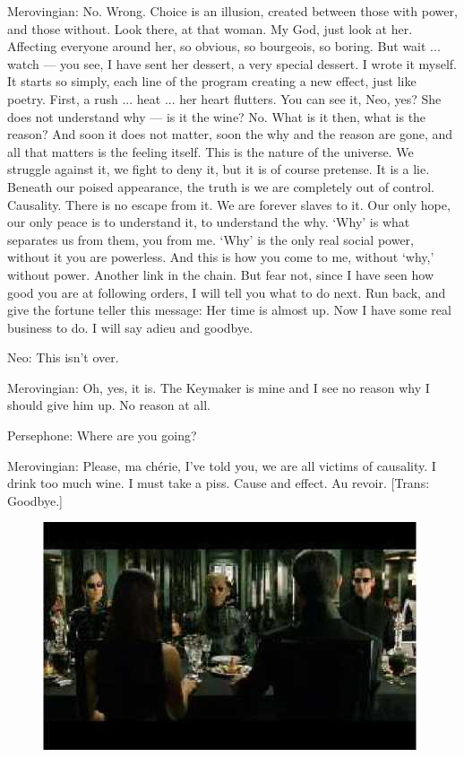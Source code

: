 \documentclass{ctexart}
\newenvironment{myquote}{\color{green} \setlength{\leftskip}{6em} \setlength{\rightskip}{4em} \setlength{\parindent}{-2em}}{\par}
\begin{document}
\begin{myquote}
Merovingian: No. Wrong. Choice is an illusion, created between those with power, and those without. Look there, at that woman. My God, just look at her. Affecting everyone around her, so obvious, so bourgeois, so boring. But wait ... watch --- you see, I have sent her dessert, a very special dessert. I wrote it myself. It starts so simply, each line of the program creating a new effect, just like poetry. First, a rush ... heat ... her heart flutters. You can see it, Neo, yes? She does not understand why --- is it the wine? No. What is it then, what is the reason? And soon it does not matter, soon the why and the reason are gone, and all that matters is the feeling itself. This is the nature of the universe. We struggle against it, we fight to deny it, but it is of course pretense. It is a lie. Beneath our poised appearance, the truth is we are completely out of control. Causality. There is no escape from it. We are forever slaves to it. Our only hope, our only peace is to understand it, to understand the why. `Why' is what separates us from them, you from me. `Why' is the only real social power, without it you are powerless. And this is how you come to me, without `why,' without power. Another link in the chain. But fear not, since I have seen how good you are at following orders, I will tell you what to do next. Run back, and give the fortune teller this message: Her time is almost up. Now I have some real business to do. I will say adieu and goodbye.

Neo: This isn't over.

Merovingian: Oh, yes, it is. The Keymaker is mine and I see no reason why I should give him up. No reason at all.

Persephone: Where are you going?

Merovingian: Please, ma chérie, I've told you, we are all victims of causality. I drink too much wine. I must take a piss. Cause and effect. Au revoir. [Trans: Goodbye.]
\end{myquote}

\begin{figure}[htb]
\centering
\includegraphics[width=0.5\linewidth]{fig/read_reloaded-94}
\end{figure}
\end{document}
